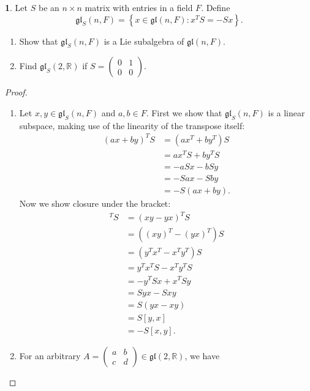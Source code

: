 \documentclass[12pt]{article}
\newcommand{\gl}{\mathfrak{gl}}
\theoremstyle{definition}
\newtheorem{ex}{}
\begin{document}
\begin{ex}
	Let $S$ be an $n \times n$ matrix with entries in a field $F$.
	Define \begin{equation*}
		\gl_S(n, F) = \left\lbrace x \in \gl(n, F) : x^T S = -S x \right\rbrace.
	\end{equation*}
	\begin{enumerate}[label=(\alph*)]
		\item Show that $\gl_S(n, F)$ is a Lie subalgebra of $\gl(n, F)$.
		\item Find $\gl_S(2, \mathbb{R})$ if $S = \begin{pmatrix}0 & 1\\0&0\end{pmatrix}$.
	\end{enumerate}
\end{ex}
\begin{proof}
	\begin{enumerate}[label=(\alph*)]
		\item Let $x, y \in \gl_S(n, F)$ and $a, b \in F$.
		      First we show that $\gl_S(n, F)$ is a linear subspace, making use of the linearity of the transpose itself: \begin{align*}
			      (ax+by)^TS & = (ax^T + by^T)S \\
			                 & = ax^TS + by^TS  \\
			                 & = -aSx - bSy     \\
			                 & = -Sax - Sby     \\
			                 & = -S(ax+by).
		      \end{align*}
		      Now we show closure under the bracket: \begin{align*}
			      [x,y]^TS & = (xy-yx)^TS         \\
			               & = ((xy)^T - (yx)^T)S \\
			               & = (y^Tx^T - x^Ty^T)S \\
			               & = y^Tx^TS - x^Ty^TS  \\
			               & = -y^TSx + x^TSy     \\
			               & = Syx - Sxy          \\
			               & = S(yx - xy)         \\
			               & = S[y, x]            \\
			               & = -S[x, y].
		      \end{align*}
		\item For an arbitrary $A = \begin{pmatrix} a & b \\ c & d \end{pmatrix} \in \gl(2, \mathbb{R})$, we have \begin{equation*}

\end{equation*}
\end{enumerate}
\end{proof}
\end{document}
